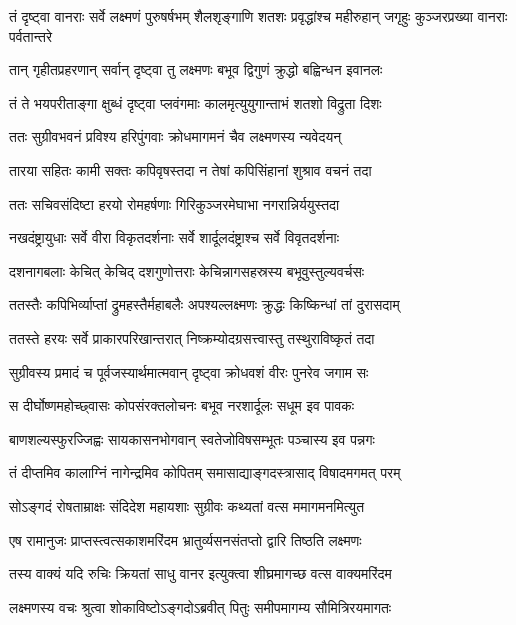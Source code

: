 \threelineshloka
{तं दृष्ट्वा वानराः सर्वे लक्ष्मणं पुरुषर्षभम्}
{शैलशृङ्गाणि शतशः प्रवृद्धांश्च महीरुहान्}
{जगृहुः कुञ्जरप्रख्या वानराः पर्वतान्तरे} %

\twolineshloka
{तान् गृहीतप्रहरणान् सर्वान् दृष्ट्वा तु लक्ष्मणः}
{बभूव द्विगुणं क्रुद्धो बह्विन्धन इवानलः} %

\twolineshloka
{तं ते भयपरीताङ्गा क्षुब्धं दृष्ट्वा प्लवंगमाः}
{कालमृत्युयुगान्ताभं शतशो विद्रुता दिशः} %

\twolineshloka
{ततः सुग्रीवभवनं प्रविश्य हरिपुंगवाः}
{क्रोधमागमनं चैव लक्ष्मणस्य न्यवेदयन्} %

\twolineshloka
{तारया सहितः कामी सक्तः कपिवृषस्तदा}
{न तेषां कपिसिंहानां शुश्राव वचनं तदा} %

\twolineshloka
{ततः सचिवसंदिष्टा हरयो रोमहर्षणाः}
{गिरिकुञ्जरमेघाभा नगरान्निर्ययुस्तदा} %

\twolineshloka
{नखदंष्ट्रायुधाः सर्वे वीरा विकृतदर्शनाः}
{सर्वे शार्दूलदंष्ट्राश्च सर्वे विवृतदर्शनाः} %

\twolineshloka
{दशनागबलाः केचित् केचिद् दशगुणोत्तराः}
{केचिन्नागसहस्रस्य बभूवुस्तुल्यवर्चसः} %

\twolineshloka
{ततस्तैः कपिभिर्व्याप्तां द्रुमहस्तैर्महाबलैः}
{अपश्यल्लक्ष्मणः क्रुद्धः किष्किन्धां तां दुरासदाम्} %

\twolineshloka
{ततस्ते हरयः सर्वे प्राकारपरिखान्तरात्}
{निष्क्रम्योदग्रसत्त्वास्तु तस्थुराविष्कृतं तदा} %

\twolineshloka
{सुग्रीवस्य प्रमादं च पूर्वजस्यार्थमात्मवान्}
{दृष्ट्वा क्रोधवशं वीरः पुनरेव जगाम सः} %

\twolineshloka
{स दीर्घोष्णमहोच्छ्वासः कोपसंरक्तलोचनः}
{बभूव नरशार्दूलः सधूम इव पावकः} %

\twolineshloka
{बाणशल्यस्फुरज्जिह्वः सायकासनभोगवान्}
{स्वतेजोविषसम्भूतः पञ्चास्य इव पन्नगः} %

\twolineshloka
{तं दीप्तमिव कालाग्निं नागेन्द्रमिव कोपितम्}
{समासाद्याङ्गदस्त्रासाद् विषादमगमत् परम्} %

\twolineshloka
{सोऽङ्गदं रोषताम्राक्षः संदिदेश महायशाः}
{सुग्रीवः कथ्यतां वत्स ममागमनमित्युत} %

\twolineshloka
{एष रामानुजः प्राप्तस्त्वत्सकाशमरिंदम}
{भ्रातुर्व्यसनसंतप्तो द्वारि तिष्ठति लक्ष्मणः} %

\twolineshloka
{तस्य वाक्यं यदि रुचिः क्रियतां साधु वानर}
{इत्युक्त्वा शीघ्रमागच्छ वत्स वाक्यमरिंदम} %

\twolineshloka
{लक्ष्मणस्य वचः श्रुत्वा शोकाविष्टोऽङ्गदोऽब्रवीत्}
{पितुः समीपमागम्य सौमित्रिरयमागतः} %

